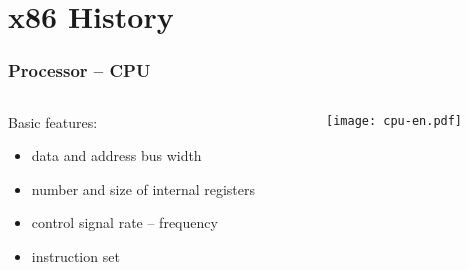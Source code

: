 \documentclass{beamer}
\subtitle{Lekce 11. Architektura x86}
\subtitle{Lecture 11. x86 Architecture}
\author{Pavel Píša \phantom{xxxxxxxxx} Petr Štěpán \\ \small\texttt{pisa@fel.cvut.cz}\phantom{xxxx}\small\texttt{stepan@fel.cvut.cz}}
\begin{document}
\maketitle

\section{x86 History}

\begin{frame}
\frametitle{Processor -- CPU}
\begin{columns}[t,onlytextwidth]
\begin{column}{0.4\textwidth}
Basic features:
  \begin{itemize}
    \item data and address bus width
    \item number and size of internal registers
    \item control signal rate – frequency
    \item instruction set
  \end{itemize}
\end{column}
\begin{column}{0.52\textwidth}  
   \begin{center}
   \texttt{[image: cpu-en.pdf]}
   \end{center}
\end{column}
\end{columns}
\end{frame}
\end{document}
